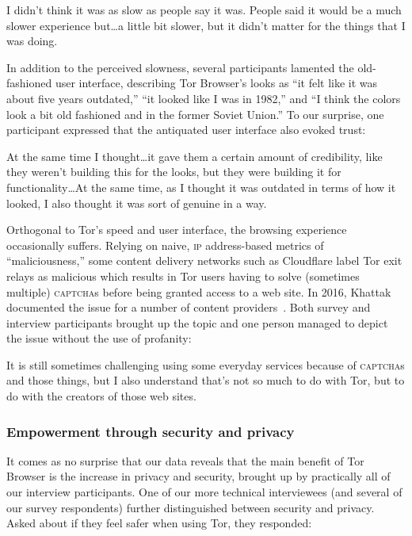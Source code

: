 \begin{displayquote}[P03]
I didn't think it was as slow as people say it was. People said it would be a
much slower experience but\ldots a little bit slower, but it didn't matter for
the things that I was doing.
\end{displayquote}

In addition to the perceived slowness, several participants lamented the
old-fashioned user interface, describing Tor Browser's looks as ``it felt like
it was about five years outdated,'' ``it looked like I was in 1982,'' and ``I
think the colors look a bit old fashioned and in the former Soviet Union.'' To
our surprise, one participant expressed that the antiquated user interface also
evoked trust:

\begin{displayquote}[P02]
At the same time I thought\ldots it gave them a certain amount of credibility,
like they weren't building this for the looks, but they were building it for
functionality\ldots  At the same time, as I thought it was outdated in terms of
how it looked, I also thought it was sort of genuine in a way.
\end{displayquote}

Orthogonal to Tor's speed and user interface, the browsing experience
occasionally suffers.  Relying on naive, \textsc{ip} address-based metrics of
``maliciousness,'' some content delivery networks such as Cloudflare label Tor
exit relays as malicious which results in Tor users having to solve (sometimes
multiple) \textsc{captcha}s before being granted access to a web site.  In 2016,
Khattak \ea documented the issue for a number of content
providers~\cite{Khattak2016a}.  Both survey and interview participants brought
up the topic and one person managed to depict the issue without the use of
profanity:

\begin{displayquote}[P06]
It is still sometimes challenging using some everyday services because of
\textsc{captcha}s and those things, but I also understand that's not so much to
do with Tor, but to do with the creators of those web sites.
\end{displayquote}

\subsubsection{Empowerment through security and privacy}

It comes as no surprise that our data reveals that the main benefit of Tor
Browser is the increase in privacy and security, brought up by practically all
of our interview participants.  One of our more technical interviewees (and
several of our survey respondents) further distinguished between security and
privacy.  Asked about if they feel safer when using Tor, they responded:

